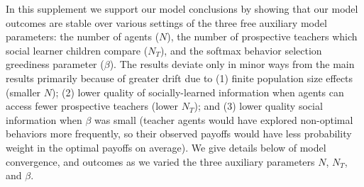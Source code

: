 \documentclass[letterpaper,11.5pt]{scrartcl}
\newcommand{\ps}[1]{{\textcolor{mygreen} {({\tiny PS:} #1)}}}
\begin{document}





In this supplement we support our model conclusions by showing that our model
outcomes are stable over various settings of the three free auxiliary model
parameters: the number of agents ($N$), the number of
prospective teachers which social learner children compare
($N_T$), and the softmax behavior selection greediness parameter ($\beta$).
The results deviate only in minor ways from the main results primarily because of greater drift
due to (1) finite population size effects (smaller $N$);
(2) lower quality of socially-learned information when agents can access fewer
prospective teachers (lower $N_T$); and (3) lower quality social information when $\beta$
was small (teacher agents would have explored non-optimal behaviors more
frequently, so their observed payoffs would have less probability weight in
the optimal payoffs on average). We give details below of model convergence, and
outcomes as we varied the three auxiliary parameters $N$, $N_T$, and $\beta$.


\clearpage
\end{document}
